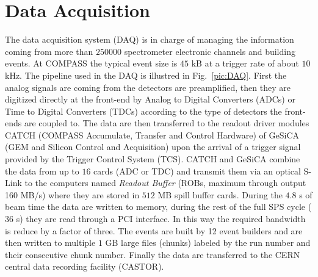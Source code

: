 
\section{Data Acquisition}

The data acquisition system (DAQ) \cite{NIM} is in charge of managing the information coming from more than $250000$ spectrometer electronic channels and building events. At COMPASS the typical event size is $45$ kB at a trigger rate of about $10$ kHz. The pipeline used in the DAQ is illustred in Fig.~\ref{pic:DAQ}. First the analog signals are coming from the detectors are preamplified, then they are digitized directly at the front-end by Analog to Digital Converters (ADCs) or Time to Digital Converters (TDCs) according to the type of detectors the front-ends are coupled to. The data are then transferred to the readout driver modules CATCH (COMPASS Accumulate, Transfer and Control Hardware) of GeSiCA (GEM and Silicon Control and Acquisition) upon the arrival of a trigger signal provided by the Trigger Control System (TCS). CATCH and GeSiCA combine the data from up to $16$ cards (ADC or TDC) and transmit them via an optical S-Link to the computers named \textit{Readout Buffer} (ROBs, maximum through output 160 MB/s) where they are stored in $512$ MB spill buffer cards. During the $4.8$ s of beam time the data are written to memory, during the rest of the full SPS cycle ($36$ s) they are read through a PCI interface. In this way the required bandwidth is reduce by a factor of three. The events are built by 12 event builders and are then written to multiple $1$ GB large files (chunks) labeled by the run number and their consecutive chunk number. Finally the data are transferred to the CERN central data recording facility (CASTOR).


